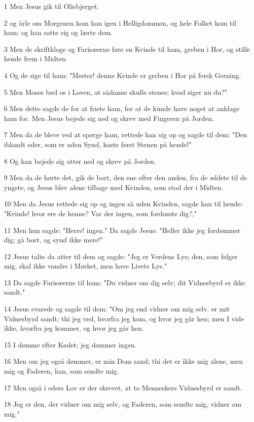 \par 1 Men Jesus gik til Oliebjerget.
\par 2 og årle om Morgenen kom han igen i Helligdommen, og hele Folket kom til ham; og han satte sig og lærte dem.
\par 3 Men de skriftkloge og Farisæerne føre en Kvinde til ham, greben i Hor, og stille hende frem i Midten.
\par 4 Og de sige til ham: "Mester! denne Kvinde er greben i Hor på fersk Gerning.
\par 5 Men Moses bød os i Loven, at sådanne skulle stenes; hvad siger nu du?"
\par 6 Men dette sagde de for at friste ham, for at de kunde have noget at anklage ham for. Men Jesus bøjede sig ned og skrev med Fingeren på Jorden.
\par 7 Men da de bleve ved at spørge ham, rettede han sig op og sagde til dem: "Den iblandt eder, som er uden Synd, kaste først Stenen på hende!"
\par 8 Og han bøjede sig atter ned og skrev på Jorden.
\par 9 Men da de hørte det, gik de bort, den ene efter den anden, fra de ældste til de yngste, og Jesus blev alene tilbage med Kvinden, som stod der i Midten.
\par 10 Men da Jesus rettede sig op og ingen så uden Kvinden, sagde han til hende: "Kvinde! hvor ere de henne? Var der ingen, som fordømte dig?,"
\par 11 Men hun sagde: "Herre! ingen." Da sagde Jesus: "Heller ikke jeg fordømmer dig; gå bort, og synd ikke mere!"
\par 12 Jesus talte da atter til dem og sagde: "Jeg er Verdens Lys; den, som følger mig, skal ikke vandre i Mørket, men have Livets Lys."
\par 13 Da sagde Farisæerne til ham: "Du vidner om dig selv; dit Vidnesbyrd er ikke sandt."
\par 14 Jesus svarede og sagde til dem: "Om jeg end vidner om mig selv. er mit Vidnesbyrd sandt; thi jeg ved, hvorfra jeg kom, og hvor jeg går hen; men I vide ikke, hvorfra jeg kommer, og hvor jeg går hen.
\par 15 I dømme efter Kødet; jeg dømmer ingen.
\par 16 Men om jeg også dømmer, er min Dom sand; thi det er ikke mig alene, men mig og Faderen, han, som sendte mig.
\par 17 Men også i eders Lov er der skrevet, at to Menneskers Vidnesbyrd er sandt.
\par 18 Jeg er den, der vidner om mig selv, og Faderen, som sendte mig, vidner om mig."
